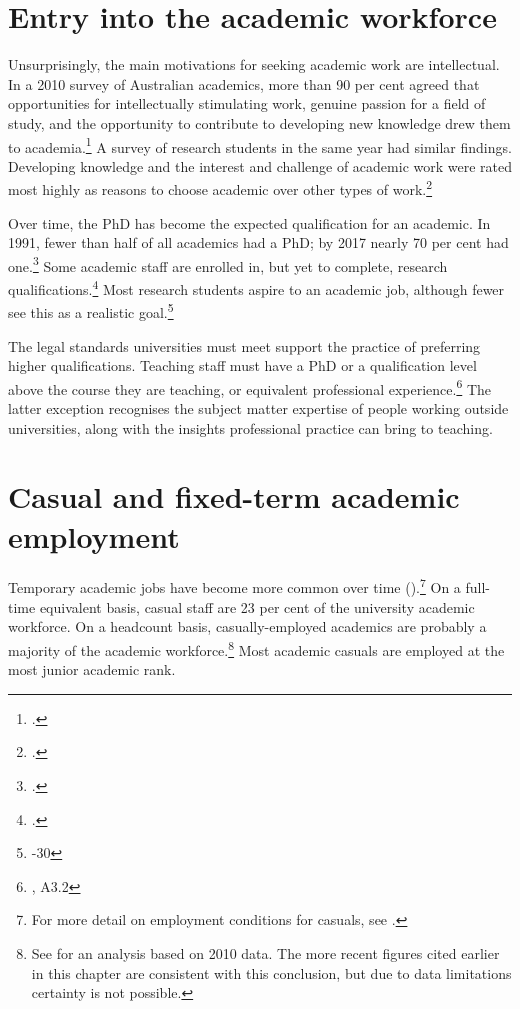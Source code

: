 \documentclass{grattan}
\begin{document}
%
\section{Entry into the academic workforce}\label{sec:entry-into-the-academic-workforce}

Unsurprisingly, the main motivations for seeking academic work are intellectual. In a 2010 survey of Australian academics, more than 90 per cent agreed that opportunities for intellectually stimulating work, genuine passion for a field of study, and the opportunity to contribute to developing new knowledge drew them to academia.\footcite[][13]{Bexley2011theaustralianacad} A survey of research students in the same year had similar findings. Developing knowledge and the interest and challenge of academic work were rated most highly as reasons to choose academic over other types of work.\footcite[][39]{Edwards2011regeneratingtheac}

Over time, the PhD has become the expected qualification for an academic. In 1991, fewer than half of all academics had a PhD; by 2017 nearly 70 per cent had one.\footcites[][table~4.2]{DepartmentofEducationandTraining2017studentsselected}[][149]{DEET1993nationalreporton} Some academic staff are enrolled in, but yet to complete, research qualifications.\footcite[][41]{Bexley2011theaustralianacad} Most research students aspire to an academic job, although fewer see this as a realistic goal.\footnote{\textcites[][22]{Edwards2011regeneratingtheac}[][29]{Bentley2017mappingtheexterna}-30}

The legal standards universities must meet support the practice of preferring higher qualifications. Teaching staff must have a PhD or a qualification level above the course they are teaching, or equivalent professional experience.\footnote{\textcite[][]{DepartmentofEducationandTraining2015highereducationre}, A3.2} The latter exception recognises the subject matter expertise of people working outside universities, along with the insights professional practice can bring to teaching.

%
\section{Casual and fixed-term academic employment }\label{sec:casual-and-fixed-term-academic-employment}

Temporary academic jobs have become more common over time ().\footnote{For more detail on employment conditions for casuals, see \textcite[][]{Andrews2016contingentacademic}.} On a full-time equivalent basis, casual staff are 23 per cent of the university academic workforce. On a headcount basis, casually-employed academics are probably a majority of the academic workforce.\footnote{See \textcite[][]{May2011casualisationhere} for an analysis based on 2010 data. The more recent figures cited earlier in this chapter are consistent with this conclusion, but due to data limitations certainty is not possible.} Most academic casuals are employed at the most junior academic rank.
\end{document}
